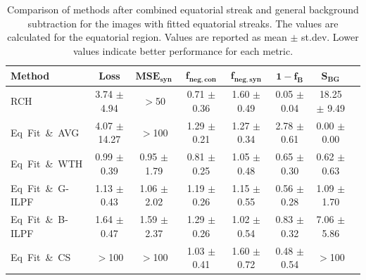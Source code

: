 \documentclass[iucr]{iucrjournals}
\begin{document}


\begin{table}[t]%
\centering
\small
\setlength{\tabcolsep}{4pt}
\renewcommand{\arraystretch}{1.3}

\begin{tabular}{lccccccr}
\toprule
\textbf{Method} & 
\textbf{Loss} &
$\mathbf{MSE}_{\mathbf{syn}}$ &
$\mathbf{f}_{\mathbf{neg,con}}$ &
$\mathbf{f}_{\mathbf{neg,syn}}$ &
$\mathbf{1-f_B}$ &
$\mathbf{S}_{\mathbf{BG}}$
\\
\midrule
RCH &  3.74 $\pm$ 4.94 & $>$50 & 0.71 $\pm$ 0.36 & 1.60 $\pm$ 0.49 & 0.05 $\pm$ 0.04 & 18.25 $\pm$ 9.49  \\
Eq~Fit~\&~AVG & 4.07 $\pm$ 14.27 & $>$100  & 1.29 $\pm$ 0.21 & 1.27 $\pm$ 0.34 & 2.78 $\pm$ 0.61 & 0.00 $\pm$ 0.00  \\
Eq~Fit~\&~WTH  & 0.99 $\pm$ 0.39 & 0.95 $\pm$ 1.79 & 0.81 $\pm$ 0.25 & 1.05 $\pm$ 0.48 & 0.65 $\pm$ 0.30 & 0.62 $\pm$ 0.63   \\
Eq~Fit~\&~G-ILPF  & 1.13 $\pm$ 0.43 & 1.06 $\pm$ 2.02 & 1.19 $\pm$ 0.26 & 1.15 $\pm$ 0.55 & 0.56 $\pm$ 0.28 & 1.09 $\pm$ 1.70  \\
Eq~Fit~\&~B-ILPF & 1.64 $\pm$ 0.47 & 1.59 $\pm$ 2.37 & 1.29 $\pm$ 0.26 & 1.02 $\pm$ 0.54 & 0.83 $\pm$ 0.32 & 7.06 $\pm$ 5.86  \\
Eq~Fit~\&~CS  & $>$100 & $>$100 & 1.03 $\pm$ 0.41 & 1.60 $\pm$ 0.72 & 0.48 $\pm$ 0.54 & $>$100   \\
\bottomrule
\end{tabular}
\caption{Comparison of methods after combined equatorial streak and general background subtraction for the images with fitted equatorial streaks. The values are calculated for the equatorial region. Values are reported as mean $\pm$ st.dev. Lower values indicate better performance for each metric.}
\label{tab:combined_eq_general}
\end{table}
\end{document}
